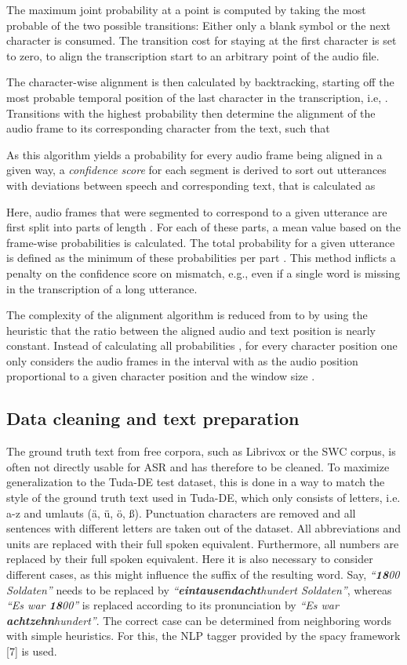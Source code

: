 \documentclass[runningheads]{llncs}
\begin{document}
The maximum joint probability at a point is computed by taking the most probable of the two possible transitions:
Either only a blank symbol or the next character is consumed.
The transition cost for staying at the first character is set to zero, to align the transcription start to an arbitrary point of the audio file.


The character-wise alignment is then calculated by backtracking, starting off the most probable temporal position of the last character in the transcription, i.e, .
Transitions with the highest probability then determine the alignment  of the audio frame  to its corresponding character from the text, such that

As this algorithm yields a probability   for every audio frame being aligned in a given way,
a \emph{confidence score}  for each segment is derived to sort out utterances with deviations between speech and corresponding text, that is calculated as

Here, audio frames that were segmented to correspond to a given utterance are first split into parts of length .
For each of these parts, a mean value  based on the frame-wise probabilities  is calculated.
The total probability  for a given utterance is defined as the minimum of these probabilities per part .
This method inflicts a penalty on the confidence score on mismatch, e.g., even if a single word is missing in the transcription of a long utterance.


The complexity of the alignment algorithm is reduced from  to  by using the heuristic that the ratio between the aligned audio and text position is nearly constant.
Instead of calculating all probabilities , for every character position  one only considers the audio frames in the interval  with  as the audio position proportional to a given character position and the window size .




\subsection{Data cleaning and text preparation}
The ground truth text from free corpora, such as Librivox or the SWC corpus, is often not directly usable for ASR and has therefore to be cleaned. To maximize generalization to the Tuda-DE test dataset, this is done in a way to match the style of the ground truth text used in Tuda-DE, which only consists of letters, i.e. a-z and umlauts ({\"a}, {\"u}, {\"o}, {\ss}).
Punctuation characters are removed and all sentences with different letters are taken out of the dataset. 
All abbreviations and units are replaced with their full spoken equivalent.
Furthermore, all numbers are replaced by their full spoken equivalent.
Here it is also necessary to consider different cases, as this might influence the suffix of the resulting word. Say, \emph{``\textbf{18}00 Soldaten''} needs to be replaced by \emph{``\textbf{eintausendacht}hundert Soldaten''}, whereas \emph{``Es war \textbf{18}00''} is replaced according to its pronunciation by \emph{``Es war \textbf{achtzehn}hundert''}.
The correct case can be determined from neighboring words with simple heuristics.
For this, the NLP tagger provided by the spacy framework [7] is used.
\end{document}
